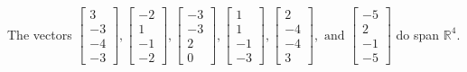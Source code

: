 \begin{exercise}
\begin{exerciseStatement}
  \end{exerciseStatement}
  \begin{exerciseAnswer}
   The vectors \(\left[\begin{array}{r}
3 \\
-3 \\
-4 \\
-3
\end{array}\right] , \left[\begin{array}{r}
-2 \\
1 \\
-1 \\
-2
\end{array}\right] , \left[\begin{array}{r}
-3 \\
-3 \\
2 \\
0
\end{array}\right] , \left[\begin{array}{r}
1 \\
1 \\
-1 \\
-3
\end{array}\right] , \left[\begin{array}{r}
2 \\
-4 \\
-4 \\
3
\end{array}\right] , \text{ and } \left[\begin{array}{r}
-5 \\
2 \\
-1 \\
-5
\end{array}\right]\) 
  	 do  
	span \(\mathbb{R}^4\).
  


  \end{exerciseAnswer}
\end{exercise}